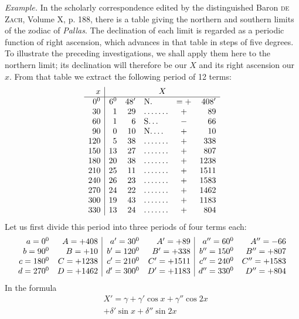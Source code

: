 \begingroup
\renewcommand{\arraystretch}{1.45}
\textit{Example.} In the scholarly correspondence edited by the distinguished Baron \textsc{de Zach}, Volume X, p. 188, there is a table giving the northern and southern limits of the zodiac of \textit{Pallas}. The declination of each limit is regarded as a periodic function of right ascension, which advances in that table in steps of five degrees. To illustrate the preceding investigations, we shall apply them here to the northern limit; its declination will therefore be our $X$ and its right ascension our $x$. From that table we extract the following period of 12 terms:
{\small\setlength{\arraycolsep}{3pt}\[
\begin{array}{r|r r l c r}
x&\multicolumn{5}{c}{X}\\ \hline
0^{\mathord{0}}&6^{\mathord{0}}&48'&\text{N.}&=+&408'\\
30&1&29&.\,.\,.\,.\,.\,.\,.&+&89\\
60&1&6&\text{S.}\,.\,.&-&66\\
90&0&10&\text{N.}\,.\,.\,.&+&10\\
120&5&38&.\,.\,.\,.\,.\,.\,.&+&338\\
150&13&27&.\,.\,.\,.\,.\,.\,.&+&807\\
180&20&38&.\,.\,.\,.\,.\,.\,.&+&1238\\
210&25&11&.\,.\,.\,.\,.\,.\,.&+&1511\\
240&26&23&.\,.\,.\,.\,.\,.\,.&+&1583\\
270&24&22&.\,.\,.\,.\,.\,.\,.&+&1462\\
300&19&43&.\,.\,.\,.\,.\,.\,.&+&1183\\
330&13&24&.\,.\,.\,.\,.\,.\,.&+&804
\end{array}
\]}
Let us first divide this period into three periods of four terms each:
{\small\setlength{\arraycolsep}{3pt}\[
\begin{array}{r r|r r|r r}
a=0^{\mathord{0}}&A=+408&a'=30^{\mathord{0}}&A'=+89&a''=60^{\mathord{0}}&A''=-66\\
b=90^{\mathord{0}}&B=+10&b'=120^{\mathord{0}}&B'=+338&b''=150^{\mathord{0}}&B''=+807\\
c=180^{\mathord{0}}&C=+1238&c'=210^{\mathord{0}}&C'=+1511&c''=240^{\mathord{0}}&C''=+1583\\
d=270^{\mathord{0}}&D=+1462&d'=300^{\mathord{0}}&D'=+1183&d''=330^{\mathord{0}}&D''=+804
\end{array}
\]}
In the formula
\[
\begin{aligned}
&X'={}\gamma+\gamma'\cos x+\gamma''\cos2x\\[5pt]
&+\delta'\sin x+\delta''\sin2x
\end{aligned}
\]
